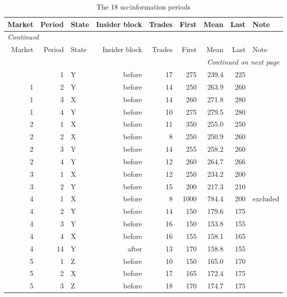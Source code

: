 \footnotesize
\begin{longtable}{rrlrrrrrl}
\caption{The 18 no-information periods}\label{tab:app-noinfo-periods}\\
\toprule
Market & Period & State & Insider block & Trades & First & Mean & Last & Note \\
\midrule
\endfirsthead
\multicolumn{9}{l}{\textit{Continued}}\\
\toprule
Market & Period & State & Insider block & Trades & First & Mean & Last & Note \\
\midrule
\endhead
\midrule
\multicolumn{9}{r}{\textit{Continued on next page}}\\
\endfoot
\bottomrule
\endlastfoot
1 & 1 & Y & before & 17 & 275 & 239.4 & 225 &  \\
1 & 2 & Y & before & 14 & 250 & 263.9 & 260 &  \\
1 & 3 & X & before & 14 & 260 & 271.8 & 280 &  \\
1 & 4 & Y & before & 10 & 275 & 279.5 & 280 &  \\
2 & 1 & X & before & 11 & 350 & 255.0 & 250 &  \\
2 & 2 & X & before & 8 & 250 & 250.9 & 260 &  \\
2 & 3 & Y & before & 14 & 255 & 258.2 & 260 &  \\
2 & 4 & Y & before & 12 & 260 & 264.7 & 266 &  \\
3 & 1 & X & before & 12 & 250 & 234.2 & 200 &  \\
3 & 2 & Y & before & 15 & 200 & 217.3 & 210 &  \\
4 & 1 & X & before & 8 & 1000 & 784.4 & 200 & excluded \\
4 & 2 & Y & before & 14 & 150 & 179.6 & 175 &  \\
4 & 3 & Y & before & 16 & 150 & 153.8 & 155 &  \\
4 & 4 & X & before & 16 & 155 & 158.1 & 165 &  \\
4 & 14 & Y & after & 13 & 170 & 158.8 & 155 &  \\
5 & 1 & Z & before & 10 & 150 & 165.0 & 170 &  \\
5 & 2 & X & before & 17 & 165 & 172.4 & 175 &  \\
5 & 3 & Z & before & 18 & 170 & 174.7 & 175 &  \\
\end{longtable}
